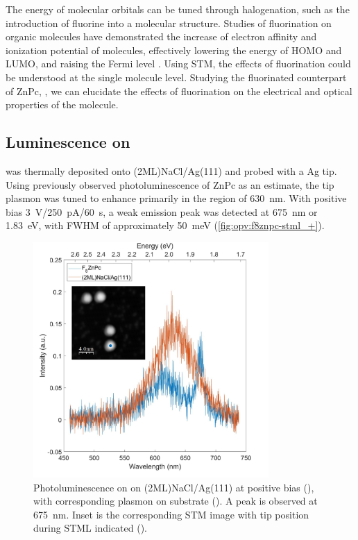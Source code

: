 The energy of molecular orbitals can be tuned through halogenation, such as the introduction of fluorine into a molecular structure. Studies of fluorination on organic molecules have demonstrated the increase of electron affinity and ionization potential of molecules, effectively lowering the energy of HOMO and LUMO, and raising the Fermi level \citep{schwarze2016band,warren2019controlling}. Using \ac{STM}, the effects of fluorination could be understood at the single molecule level. Studying the fluorinated counterpart of ZnPc, , we can elucidate the effects of fluorination on the electrical and optical properties of the molecule.


\subsection{Luminescence on }

 was thermally deposited onto (2ML)NaCl/Ag(111) and probed with a Ag tip. Using previously observed photoluminescence of ZnPc as an estimate, the tip plasmon was tuned to enhance primarily in the region of \SI{630}{nm}. With positive bias \SI{3}{V}/\SI{250}{pA}/\SI{60}{s}, a weak emission peak was detected at \SI{675}{nm} or \SI{1.83}{eV}, with FWHM of approximately \SI{50}{meV} (\autoref{fig:opv:f8znpc-stml_+}).

\begin{figure} [H]
    \centering
        \includegraphics[width=0.8\textwidth]{pictures/f8znpc_+ve_emission_inset.png}
    \caption{Photoluminescence on  on (2ML)NaCl/Ag(111) at positive bias (), with corresponding plasmon on substrate (). A peak is observed at \SI{675}{nm}. Inset is the corresponding STM image with tip position during STML indicated (). }
    \label{fig:opv:f8znpc-stml_+}
\end{figure}


